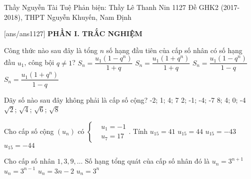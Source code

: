 \begin{name}
{Thầy Nguyễn Tài Tuệ \newline Phản biện: Thầy Lê Thanh Nin }
{1127 Đề GHK2 (2017-2018), THPT Nguyễn Khuyến, Nam Định}
	\end{name}
	\setcounter{ex}{0}\setcounter{bt}{0}
	[ans/ans1127]
	\noindent\textbf{PHẦN I. TRẮC NGHIỆM}
	\begin{ex}%
		Công thức nào sau đây là tổng $n$ số hạng đầu tiên của cấp số nhân có số hạng đầu $u_1$, công bội $q\ne 1$? 
		\choice
		{$S_n=\dfrac{u_1(1-q^n)}{1+q}$ }
		{$S_n=\dfrac{u_1(1+q^n)}{1+q}$ }
		{\True $S_n=\dfrac{u_1(1-q^n)}{1-q}$ }
		{$S_n=\dfrac{u_1(1+q^n)}{1-q}$
		}
	\end{ex}
	\begin{ex}%
		Dãy số nào sau đây không phải là cấp số cộng?
		\choice
		{-2; 1; 4; 7}
		{2; -1; -4; -7}
		{8; 4; 0; -4}
		{\True $\sqrt{2}$; $\sqrt{4}$; $\sqrt{6}$; $\sqrt{8}$}
	\end{ex}
	
	
	\begin{ex}%
		Cho cấp số cộng $\left({u_n}\right)$ có $\left\{\begin{aligned}& u_1=-1 \\
		& u_7=17 
		\end{aligned}\right.$. Tính  
		\choice
		{\True $u_{15}=41$}
		{$u_{15}=44$}
		{$u_{15}=-43$}
		{$u_{15}=-44$}
	\end{ex}
	\begin{ex}%
		Cho cấp số nhân $1,3,9,\dots$ Số hạng tổng quát của cấp số nhân đó là
		\choice
		{$u_n=3^{n+1}$}
		{\True $u_n=3^{n-1}$}
		{$u_n=3n-2$}
		{$u_n=3^n$}
	\end{ex}
	
